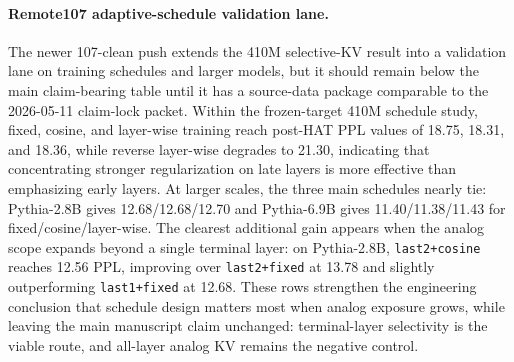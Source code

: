 
\paragraph{Remote107 adaptive-schedule validation lane.}
The newer 107-clean push extends the 410M selective-KV result into a validation lane on training schedules and larger models, but it should remain below the main claim-bearing table until it has a source-data package comparable to the 2026-05-11 claim-lock packet. Within the frozen-target 410M schedule study, fixed, cosine, and layer-wise training reach post-HAT PPL values of 18.75, 18.31, and 18.36, while reverse layer-wise degrades to 21.30, indicating that concentrating stronger regularization on late layers is more effective than emphasizing early layers. At larger scales, the three main schedules nearly tie: Pythia-2.8B gives 12.68/12.68/12.70 and Pythia-6.9B gives 11.40/11.38/11.43 for fixed/cosine/layer-wise. The clearest additional gain appears when the analog scope expands beyond a single terminal layer: on Pythia-2.8B, \texttt{last2+cosine} reaches 12.56 PPL, improving over \texttt{last2+fixed} at 13.78 and slightly outperforming \texttt{last1+fixed} at 12.68. These rows strengthen the engineering conclusion that schedule design matters most when analog exposure grows, while leaving the main manuscript claim unchanged: terminal-layer selectivity is the viable route, and all-layer analog KV remains the negative control.
